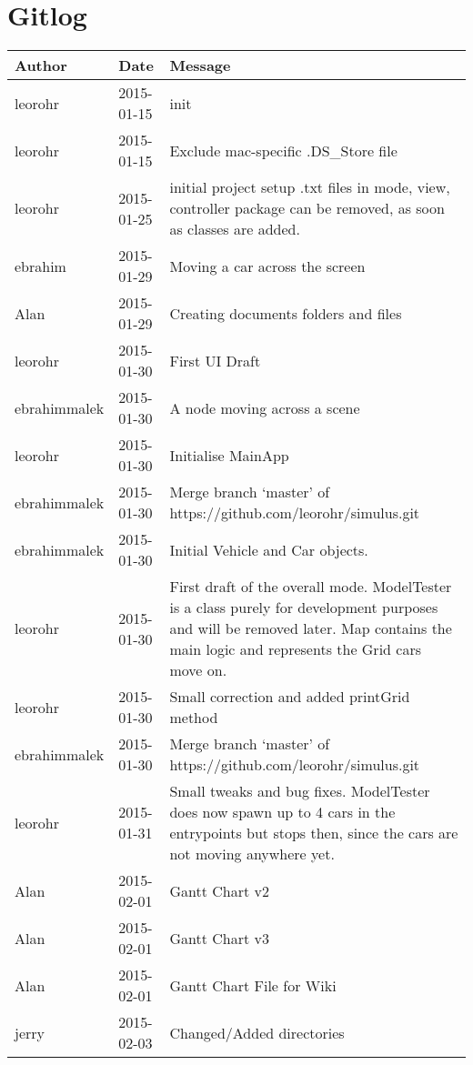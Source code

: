 \chapter{Gitlog}
\begin{center}
\begin{longtabu} to \textwidth {|
    X[4,l]|
    X[3,c]|
    X[8,l]|}
    \hline
    \textbf{Author} & \textbf{Date} & \textbf{Message} \\ \hline
leorohr & 2015-01-15 & init \\ \hline
leorohr & 2015-01-15 & Exclude mac-specific .DS\_Store file \\ \hline
leorohr & 2015-01-25 & initial project setup .txt files in mode, view, controller package can be removed, as soon as classes are added. \\ \hline
ebrahim & 2015-01-29 & Moving a car across the screen \\ \hline
Alan & 2015-01-29 & Creating documents folders and files \\ \hline
leorohr & 2015-01-30 & First UI Draft \\ \hline
ebrahimmalek & 2015-01-30 & A node moving across a scene \\ \hline
leorohr & 2015-01-30 & Initialise MainApp \\ \hline
ebrahimmalek & 2015-01-30 & Merge branch `master' of https://github.com/leorohr/simulus.git \\ \hline
ebrahimmalek & 2015-01-30 & Initial Vehicle and Car objects. \\ \hline
leorohr & 2015-01-30 & First draft of the overall mode. ModelTester is a class purely for development purposes and will be removed later. Map contains the main logic and represents the Grid cars move on. \\ \hline
leorohr & 2015-01-30 & Small correction and added printGrid method \\ \hline
ebrahimmalek & 2015-01-30 & Merge branch `master' of https://github.com/leorohr/simulus.git \\ \hline
leorohr & 2015-01-31 & Small tweaks and bug fixes. ModelTester does now spawn up to 4 cars in the entrypoints but stops then, since the cars are not moving anywhere yet. \\ \hline
Alan & 2015-02-01 & Gantt Chart v2 \\ \hline
Alan & 2015-02-01 & Gantt Chart v3 \\ \hline
Alan & 2015-02-01 & Gantt Chart File for Wiki \\ \hline
jerry & 2015-02-03 & Changed/Added directories \\ \hline

\end{longtabu}
\end{center}
